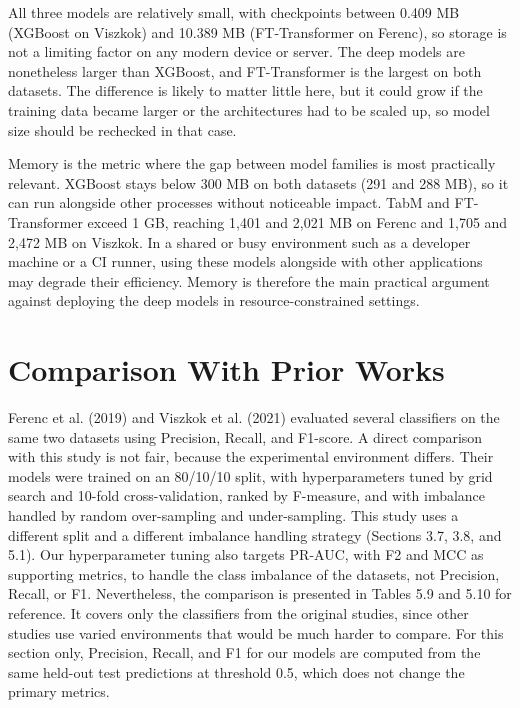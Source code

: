 All three models are relatively small, with checkpoints between 0.409 MB (XGBoost on Viszkok) and 10.389 MB (FT-Transformer on Ferenc), so storage is not a limiting factor on any modern device or server. The deep models are nonetheless larger than XGBoost, and FT-Transformer is the largest on both datasets. The difference is likely to matter little here, but it could grow if the training data became larger or the architectures had to be scaled up, so model size should be rechecked in that case.

Memory is the metric where the gap between model families is most practically relevant. XGBoost stays below 300 MB on both datasets (291 and 288 MB), so it can run alongside other processes without noticeable impact. TabM and FT-Transformer exceed 1 GB, reaching 1,401 and 2,021 MB on Ferenc and 1,705 and 2,472 MB on Viszkok. In a shared or busy environment such as a developer machine or a CI runner, using these models alongside with other applications may degrade their efficiency. Memory is therefore the main practical argument against deploying the deep models in resource-constrained settings.

\section{Comparison With Prior Works}

Ferenc et al. (2019) and Viszkok et al. (2021) evaluated several classifiers on the same two datasets using Precision, Recall, and F1-score. A direct comparison with this study is not fair, because the experimental environment differs. Their models were trained on an 80/10/10 split, with hyperparameters tuned by grid search and 10-fold cross-validation, ranked by F-measure, and with imbalance handled by random over-sampling and under-sampling. This study uses a different split and a different imbalance handling strategy (Sections 3.7, 3.8, and 5.1). Our hyperparameter tuning also targets PR-AUC, with F2 and MCC as supporting metrics, to handle the class imbalance of the datasets, not Precision, Recall, or F1. Nevertheless, the comparison is presented in Tables 5.9 and 5.10 for reference. It covers only the classifiers from the original studies, since other studies use varied environments that would be much harder to compare. For this section only, Precision, Recall, and F1 for our models are computed from the same held-out test predictions at threshold 0.5, which does not change the primary metrics. 

